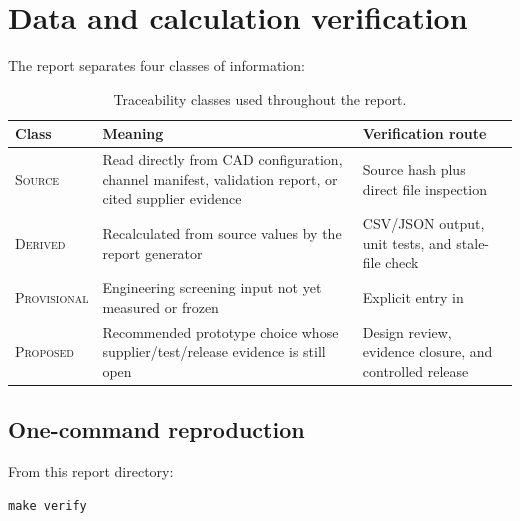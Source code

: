 \documentclass[10pt,letterpaper]{article}
\newcommand{\proposal}{\textsc{Proposed}}
\newcommand{\derived}{\textsc{Derived}}
\newcommand{\sourcevalue}{\textsc{Source}}
\newcommand{\provisional}{\textsc{Provisional}}
\begin{document}
\section{Data and calculation verification}
\label{sec:verification}

The report separates four classes of information:
\begin{table}[htbp]
  \centering
  \small
  \caption{Traceability classes used throughout the report.}
  \begin{tabularx}{\textwidth}{L{0.17\textwidth}Y Y}
    \toprule
    Class & Meaning & Verification route \\
    \midrule
    \sourcevalue & Read directly from CAD configuration, channel manifest, validation report,
      or cited supplier evidence & Source hash plus direct file inspection \\
    \derived & Recalculated from source values by the report generator &
      CSV/JSON output, unit tests, and stale-file check \\
    \provisional & Engineering screening input not yet measured or frozen &
      Explicit entry in  \\
    \proposal & Recommended prototype choice whose supplier/test/release evidence is still open &
      Design review, evidence closure, and controlled release \\
    \bottomrule
  \end{tabularx}
\end{table}

\subsection{One-command reproduction}

From this report directory:
\begin{Verbatim}[fontsize=\small,frame=single]
make verify
\end{Verbatim}
\end{document}
